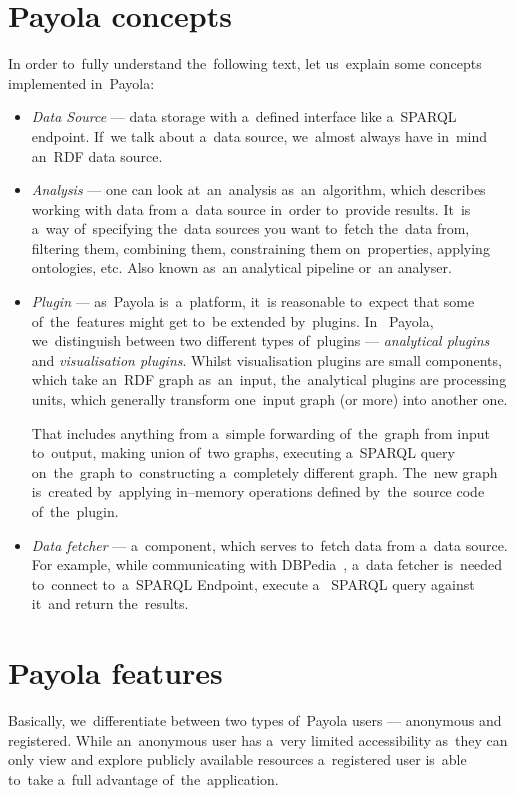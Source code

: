 \section{Payola concepts}
In order to~fully understand the~following text, let us~explain some concepts 
implemented in~Payola:
\begin{itemize}
  \item \emph{Data Source} --- data storage with a~defined interface like a~SPARQL endpoint.
  If~we talk about a~data source, we~almost always have in~mind an~RDF data source.
  
  \item \emph{Analysis} --- one can look at~an~analysis as~an~algorithm, which 
  describes working with data from a~data source in~order to~provide results. 
  It~is a~way of~specifying the~data sources you want to~fetch the~data from, 
  filtering them, combining them, constraining them on~properties, applying 
  ontologies, etc. Also known as~an analytical pipeline or~an analyser.  
  
  \item \emph{Plugin} --- as~Payola is~a~platform, it~is reasonable to~expect that 
  some of~the~features might get to~be extended by~plugins. In~  Payola, we~distinguish between two different types of~plugins --- \emph{analytical plugins} and 
  \emph{visualisation plugins}. Whilst visualisation plugins are small components, 
  which take an~RDF graph as~an~input, the~analytical plugins are processing 
  units, which generally transform one~input graph (or more) into another one.
  
  That includes anything from a~simple forwarding of~the~graph from input to~output, 
  making union of~two graphs, executing a~SPARQL query on~the~graph to~constructing 
  a~completely different graph. The~new graph is~created by~applying in--memory
  operations defined by~the~source code of~the~plugin.
  
  \item \emph{Data fetcher} --- a~component, which serves to~fetch data from a~data 
  source. For example, while communicating with DBPedia~\cite{dbpedia},
  a~data fetcher is~needed to~connect to~a~SPARQL Endpoint, execute a~  SPARQL query against it~and return the~results.
\end{itemize}

\section{Payola features}
Basically, we~differentiate between two types of~Payola users --- anonymous and registered. 
While an~anonymous user has a~very limited accessibility as~they can only 
view and explore publicly available resources a~registered user is~able to~take a~full advantage of~the~application.

